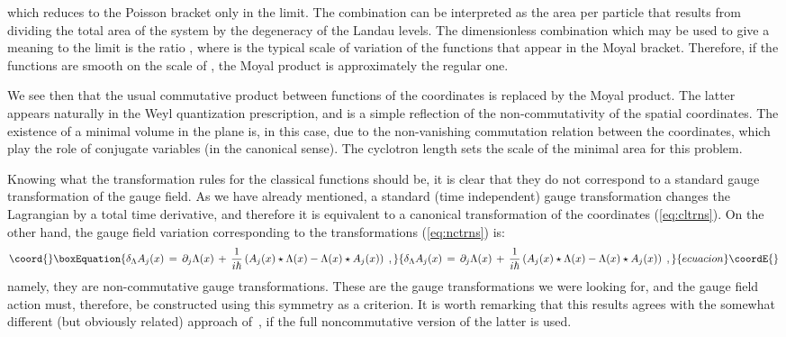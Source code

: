 \documentclass[a4paper,12pt]{article}
\begin{document}
which reduces to the Poisson bracket only in the \coordHE{} limit.  The
combination \coordHE{} can be interpreted as
the area per
particle that results from dividing the total area of the system by
the degeneracy of the Landau levels. The dimensionless combination
which may be used to give a meaning to the \coordHE{}
limit is the
ratio \coordHE{}, where \coordHE{} is the typical scale of
variation of the
functions that appear in the Moyal bracket.  Therefore, if the
functions are smooth on the scale of \myHighlight{$\hbar \theta$}\coordHE{}, the Moyal
product is
approximately the regular one.

We see then that the usual commutative product between functions of
the coordinates is replaced by the Moyal product. The latter
appears
naturally in the Weyl quantization prescription, and is a simple
reflection of the non-commutativity of the spatial coordinates.
The
existence of a minimal volume in the plane is, in this case, due to
the non-vanishing commutation relation between the coordinates,
which
play the role of conjugate variables (in the canonical sense).  The
cyclotron length sets the scale of the minimal area for this
problem.

Knowing what the transformation rules for the classical \coordHE{}
functions should be, it is clear that they do not correspond to a
standard gauge transformation of the gauge field. As we have
already
mentioned, a standard (time independent) gauge transformation
changes
the Lagrangian by a total time derivative, and therefore it is
equivalent to a canonical transformation of the coordinates
(\ref{eq:cltrns}).  On the other hand, the gauge field variation
corresponding to the transformations (\ref{eq:nctrns}) is:
\begin{equation}\coord{}\boxEquation{
  \label{eq:ncgt}
\delta_\Lambda  A_j(x) \,=\, \partial_j \Lambda (x)\,+\, \frac{1}{i
\hbar} \left( A_j (x) \star 
\Lambda (x) - \Lambda (x) \star A_j (x) \right) \;,   
}{
  \delta_\Lambda  A_j(x) \,=\, \partial_j \Lambda (x)\,+\, \frac{1}{i
\hbar} \left( A_j (x) \star 
\Lambda (x) - \Lambda (x) \star A_j (x) \right) \;,   
}{ecuacion}\coordE{}\end{equation}
namely, they are \coordHE{} non-commutative gauge transformations.
These
are the gauge transformations we were looking for, and the gauge
field
action must, therefore, be constructed using this symmetry as a
criterion. It is worth remarking that this results agrees with the
somewhat different (but obviously related) approach
of~\cite{susskind}, if the full noncommutative version of the
latter
is used.
\end{document}
